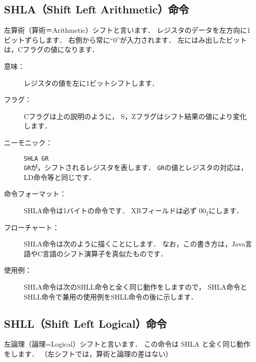 \subsection{SHLA（Shift Left Arithmetic）命令}
左算術（算術＝Arithmetic）シフトと言います．
レジスタのデータを左方向に1ビットずらします．
右側から常に``0''が入力されます．
左にはみ出したビットは，Cフラグの値になります．

\begin{center}
\end{center}

\begin{description}
\item[意味：]レジスタの値を左に1ビットシフトします．

\item[フラグ：]Cフラグは上の説明のように，
  S，Zフラグはシフト結果の値により変化します．

\item[ニーモニック：]\texttt{SHLA  GR} \\
  \texttt{GR}が，シフトされるレジスタを表します．
  \texttt{GR}の値とレジスタの対応は，LD命令等と同じです．

\item[命令フォーマット：]SHLA命令は1バイトの命令です．
  XRフィールドは必ず $00_2$にします．


\item[フローチャート：]SHLA命令は次のように描くことにします．
  なお，この書き方は，Java言語やC言語のシフト演算子を真似たものです．

  \begin{center}
  \end{center}

\item[使用例：] SHLA命令は次のSHLL命令と全く同じ動作をしますので，
  SHLA命令とSHLL命令で兼用の使用例をSHLL命令の後に示します．

\end{description}

\newpage
\subsection{SHLL（Shift Left Logical）命令}
左論理（論理=Logical）シフトと言います．
この命令は SHLA と全く同じ動作をします．
（左シフトでは，算術と論理の差はない）

